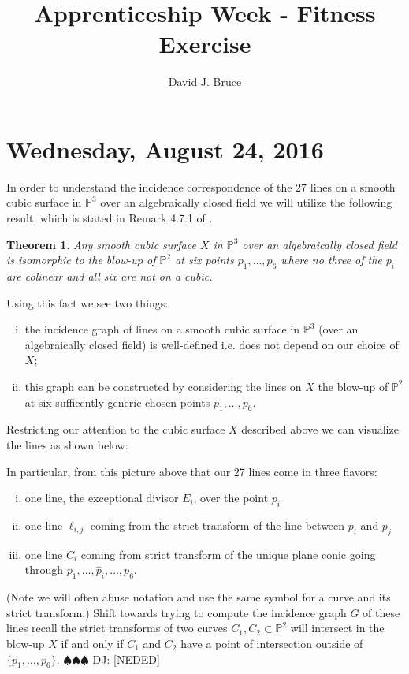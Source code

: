 \documentclass[11pt]{amsart}
\title{Apprenticeship Week - Fitness Exercise}
\author{David J. Bruce}
\newtheorem{theorem}[lemma]{Theorem}
\theoremstyle{remark}
\renewcommand{\P}{\mathbb{P}}
\newcommand{\deej}[1]{{\color{red} \sf $\spadesuit\spadesuit\spadesuit$ DJ: [#1]}}
\begin{document}
 
\maketitle
\tableofcontents


\section{Wednesday, August 24, 2016}

In order to understand the incidence correspondence of the 27 lines on a smooth cubic surface in $\P^3$ over an algebraically closed field we will utilize the following result, which is stated in Remark 4.7.1 of \cite{hartshorne}.

\begin{theorem}
Any smooth cubic surface $X$ in $\P^3$ over an algebraically closed field is isomorphic to the blow-up of $\P^2$ at six points $p_1,\ldots,p_6$ where no three of the $p_i$ are colinear and all six are not on a cubic.
\end{theorem}

Using this fact we see two things:
\begin{enumerate}[(i)]
\item the incidence graph of lines on a smooth cubic surface in $\P^3$ (over an algebraically closed field) is well-defined i.e. does not depend on our choice of $X$;
\item this graph can be constructed by considering the lines on $X$ the blow-up of $\P^2$ at six sufficently generic chosen points $p_1,\ldots,p_6$. 
\end{enumerate}
Restricting our attention to the cubic surface $X$ described above we can visualize the lines as shown below:

In particular, from this picture above that our 27 lines come in three flavors:
\begin{enumerate}[(i)]
\item one line, the exceptional divisor $E_i$, over the point $p_i$ 
\item one line $\ell_{i,j}$ coming from the strict transform of the line between $p_i$ and $p_j$
\item one line $C_i$ coming from strict transform of the unique plane conic going through $p_1,\ldots,\hat{p}_i,\ldots,p_6$.
\end{enumerate}
(Note we will often abuse notation and use the same symbol for a curve and its strict transform.) Shift towards trying to compute the incidence graph $G$ of these lines recall the strict transforms of two curves $C_1, C_2\subset\P^2$ will intersect in the blow-up $X$ if and only if $C_1$ and $C_2$ have a point of intersection outside of $\{p_1,\ldots,p_6\}$. \deej{NEDED}
\end{document}
